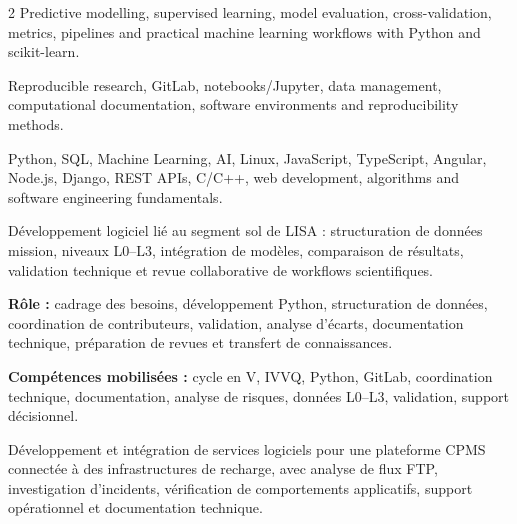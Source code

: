 \documentclass[8pt,a4paper,ragged2e,withhyper]{altacv}
\begin{document}
\begin{paracol}{2}
\small{Predictive modelling, supervised learning, model evaluation, cross-validation, metrics, pipelines and practical machine learning workflows with Python and scikit-learn.}

\divider

\small{Reproducible research, GitLab, notebooks/Jupyter, data management, computational documentation, software environments and reproducibility methods.}

\divider

\small{Python, SQL, Machine Learning, AI, Linux, JavaScript, TypeScript, Angular, Node.js, Django, REST APIs, C/C++, web development, algorithms and software engineering fundamentals.}

\end{paracol}



Développement logiciel lié au segment sol de LISA : structuration de données mission, niveaux L0--L3, intégration de modèles, comparaison de résultats, validation technique et revue collaborative de workflows scientifiques.

\textbf{Rôle :} cadrage des besoins, développement Python, structuration de données, coordination de contributeurs, validation, analyse d’écarts, documentation technique, préparation de revues et transfert de connaissances.

\textbf{Compétences mobilisées :} cycle en V, IVVQ, Python, GitLab, coordination technique, documentation, analyse de risques, données L0--L3, validation, support décisionnel.

\divider


Développement et intégration de services logiciels pour une plateforme CPMS connectée à des infrastructures de recharge, avec analyse de flux FTP, investigation d’incidents, vérification de comportements applicatifs, support opérationnel et documentation technique.
\end{document}
